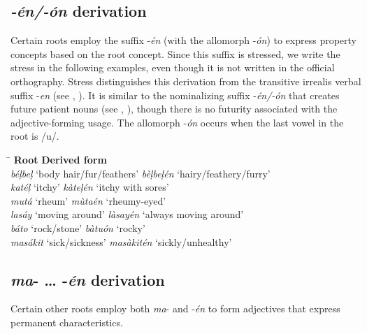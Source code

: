 \subsection{\textit{-én/-ón} derivation}
\label{bkm:Ref117512242}

Certain roots employ the suffix -\textit{én} (with the allomorph -\textit{ón}) to express property concepts based on the root concept. Since this suffix is stressed, we write the stress in the following examples, even though it is not written in the official orthography. Stress distinguishes this derivation from the transitive irrealis verbal suffix {}-\textit{en} (see , ). It is similar to the nominalizing suffix {}-\textit{én/-ón} that creates future patient nouns (see , ), though there is no futurity associated with the adjective-forming usage. The allomorph {}-\textit{ón} occurs when the last vowel in the root is /u/.

\ea
\begin{tabbing}
\hspace{5cm} \= \kill
\textbf{Root}   \>    \textbf{Derived form} \\
\textit{béļbeļ} ‘body hair/fur/feathers’ \> \textit{bèļbeļén} ‘hairy/feathery/furry’ \\
\textit{katéļ} ‘itchy’   \> \textit{kàteļén} ‘itchy with sores’ \\
\textit{mutá} ‘rheum’ \>   \textit{mùtaén} ‘rheumy-eyed’ \\
\textit{lasáy} ‘moving around’ \> \textit{làsayén} ‘always moving around’ \\
\textit{báto} ‘rock/stone’ \>   \textit{bàtuón} ‘rocky’ \\
\textit{masákit } ‘sick/sickness’ \> \textit{masàkitén} ‘sickly/unhealthy’
\end{tabbing}
\z
\subsection{\textit{ma}{}- … -\textit{én} derivation}
\label{sec:ma-en-derivation}

Certain other roots employ both \textit{ma}{}- and -\textit{én} to form adjectives that express permanent characteristics.

